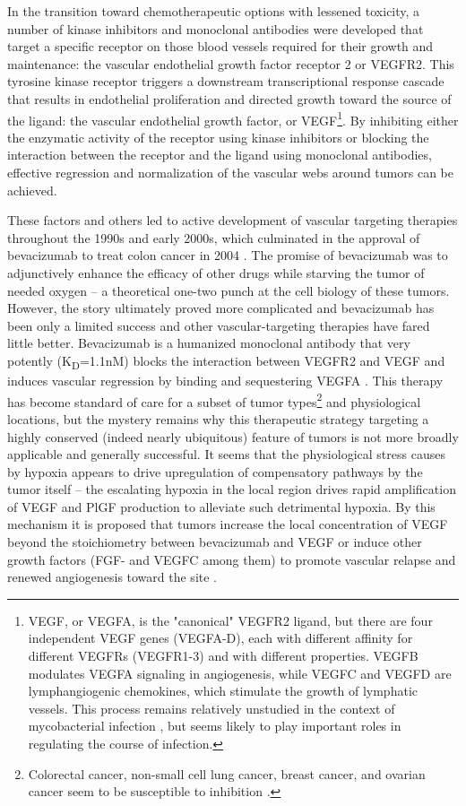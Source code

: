 In the transition toward chemotherapeutic options with lessened toxicity, a number of kinase inhibitors and monoclonal antibodies were developed that target a specific receptor on those blood vessels required for their growth and maintenance: the vascular endothelial growth factor receptor 2 or VEGFR2. This tyrosine kinase receptor triggers a downstream transcriptional response cascade that results in endothelial proliferation and directed growth toward the source of the ligand: the vascular endothelial growth factor, or VEGF\footnote{VEGF, or VEGFA, is the "canonical" VEGFR2 ligand, but there are four independent VEGF genes (VEGFA-D), each with different affinity for different VEGFRs (VEGFR1-3) and with different properties. VEGFB modulates VEGFA signaling in angiogenesis, while VEGFC and VEGFD are lymphangiogenic chemokines, which stimulate the growth of lymphatic vessels. This process remains relatively unstudied in the context of mycobacterial infection \citep{Harding2015}, but seems likely to play important roles in regulating the course of infection.}. By inhibiting either the enzymatic activity of the receptor using kinase inhibitors or blocking the interaction between the receptor and the ligand using monoclonal antibodies, effective regression and normalization of the vascular webs around tumors can be achieved. 

These factors and others led to active development of vascular targeting therapies throughout the 1990s and early 2000s, which culminated in the approval of bevacizumab to treat colon cancer in 2004 \citep{Ferrara2004}. The promise of bevacizumab was to adjunctively enhance the efficacy of other drugs while starving the tumor of needed oxygen -- a theoretical one-two punch at the cell biology of these tumors. However, the story ultimately proved more complicated and bevacizumab has been only a limited success and other vascular-targeting therapies have fared little better. Bevacizumab is a humanized monoclonal antibody that very potently (K\textsubscript{D}=1.1nM) blocks the interaction between VEGFR2 and VEGF and induces vascular regression by binding and sequestering VEGFA \citep{Papadopolous2012, Yang2014}. This therapy has become standard of care for a subset of tumor types\footnote{Colorectal cancer, non-small cell lung cancer, breast cancer, and ovarian cancer seem to be susceptible to inhibition \citep{KazaziHyseni2010, Garcia2013}.} and physiological locations, but the mystery remains why this therapeutic strategy targeting a highly conserved (indeed nearly ubiquitous) feature of tumors is not more broadly applicable and generally successful. It seems that the physiological stress causes by hypoxia appears to drive upregulation of compensatory pathways by the tumor itself -- the escalating hypoxia in the local region drives rapid amplification of VEGF and PlGF production to alleviate such detrimental hypoxia. By this mechanism it is proposed that tumors increase the local concentration of VEGF beyond the stoichiometry between bevacizumab and VEGF or induce other growth factors (FGF-\textbeta{} and VEGFC among them) to promote vascular relapse and renewed angiogenesis toward the site \citep{Haibe2020, Montemagno2020, Zhao2017, Zahra2021, Michaelsen2018}. 

